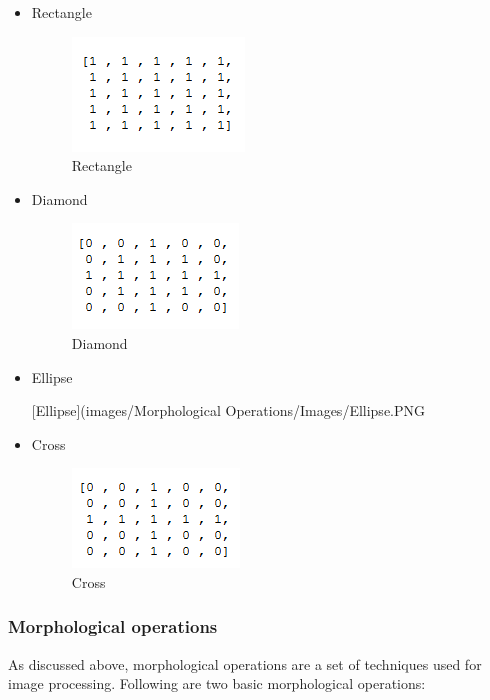 \documentclass[]{article}
\begin{document}
\begin{itemize}
\item
  Rectangle

  \begin{figure}[htbp]
  \centering
  \includegraphics{images/Morphological Operations/Images/Rectangle.PNG}
  \caption{Rectangle}
  \end{figure}
\item
  Diamond

  \begin{figure}[htbp]
  \centering
  \includegraphics{images/Morphological Operations/Images/Diamond.PNG}
  \caption{Diamond}
  \end{figure}
\item
  Ellipse

  {[}Ellipse{]}(images/Morphological Operations/Images/Ellipse.PNG
\item
  Cross

  \begin{figure}[htbp]
  \centering
  \includegraphics{images/Morphological Operations/Images/Cross.PNG}
  \caption{Cross}
  \end{figure}
\end{itemize}

\subsubsection{Morphological operations}\label{morphological-operations}

As discussed above, morphological operations are a set of techniques
used for image processing. Following are two basic morphological
operations:
\end{document}
